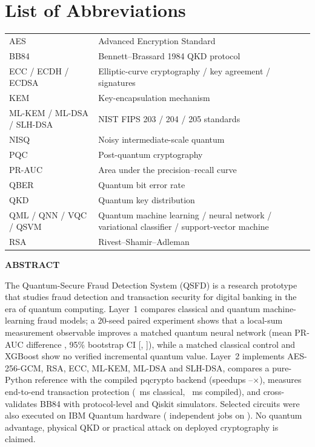 \documentclass[12pt,a4paper]{report}
\begin{document}
\chapter*{List of Abbreviations}
\begin{tabular}{@{}ll@{}}
AES & Advanced Encryption Standard\\
BB84 & Bennett--Brassard 1984 QKD protocol\\
ECC / ECDH / ECDSA & Elliptic-curve cryptography / key agreement / signatures\\
KEM & Key-encapsulation mechanism\\
ML-KEM / ML-DSA / SLH-DSA & NIST FIPS 203 / 204 / 205 standards\\
NISQ & Noisy intermediate-scale quantum\\
PQC & Post-quantum cryptography\\
PR-AUC & Area under the precision--recall curve\\
QBER & Quantum bit error rate\\
QKD & Quantum key distribution\\
QML / QNN / VQC / QSVM & Quantum machine learning / neural network / variational classifier / support-vector machine\\
RSA & Rivest--Shamir--Adleman\\
\end{tabular}

\clearpage
{}
\begin{center}{\fontsize{12}{14}\bfseries\selectfont ABSTRACT}\end{center}
\vspace{2\baselineskip}
\begin{itshape}
\noindent The Quantum-Secure Fraud Detection System (QSFD) is a research prototype that studies fraud detection and transaction security for digital banking in the era of quantum computing. Layer~1 compares classical and quantum machine-learning fraud models; a 20-seed paired experiment shows that a local-sum measurement observable improves a matched quantum neural network (mean PR-AUC difference \LsDelta{}, 95\% bootstrap CI [\LsCIlo{}, \LsCIhi{}]), while a matched classical control and XGBoost show no verified incremental quantum value. Layer~2 implements AES-256-GCM, RSA, ECC, ML-KEM, ML-DSA and SLH-DSA, compares a pure-Python reference with the compiled pqcrypto backend (speedups \SpeedupMin{}--\SpeedupMax{}$\times$), measures end-to-end transaction protection (\EEAMedian{}~ms classical, \EECMedian{}~ms compiled), and cross-validates BB84 with protocol-level and Qiskit simulators. Selected circuits were also executed on IBM Quantum hardware (\HwJobs{} independent jobs on \HwBackend{}). No quantum advantage, physical QKD or practical attack on deployed cryptography is claimed.
\end{itshape}
\end{document}
